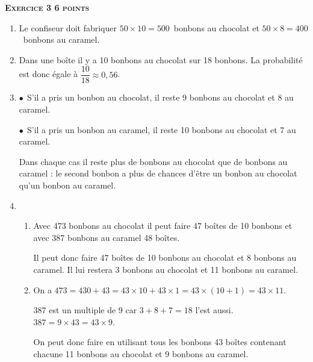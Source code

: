 \textbf{\textsc{Exercice 3 \hfill 6 points}}

\medskip

%

\begin{enumerate}
\item %
Le confiseur doit fabriquer $50\times 10 = 500$~bonbons au chocolat et $50 \times 8 = 400$~bonbons au caramel.
\item %
Dans une boîte il y a 10 bonbons au chocolat sur 18 bonbons. La probabilité est donc égale à $\dfrac{10}{18} \approx 0,56$.
\item %
$\bullet~~$S'il a pris un bonbon au chocolat, il reste 9 bonbons au chocolat et 8 au caramel.

$\bullet~~$S'il a pris un bonbon au caramel, il reste 10 bonbons au chocolat et 7 au caramel.

Dans chaque cas il reste plus de bonbons au chocolat que de bonbons au caramel : le second bonbon a plus de chances d'être un bonbon au chocolat qu'un bonbon au caramel.
\item %
	\begin{enumerate}
		\item %
Avec 473 bonbons au chocolat il peut faire 47 boîtes de 10 bonbons et avec 387 bonbons au caramel 48 boîtes.

Il peut donc faire 47 boîtes de 10 bonbons au chocolat et 8 bonbons au caramel. Il lui restera 3 bonbons au chocolat et 11 bonbons au caramel.
		\item %
On a $473 = 430 + 43 = 43\times 10 + 43\times 1 = 43 \times (10 + 1) = 43 \times 11$.

387 est un multiple de 9 car $3 + 8 + 7 = 18$ l'est aussi. $387 = 9 \times 43 = 43 \times 9$.

On peut donc faire en utilisant tous les bonbons 43 boîtes contenant chacune 11 bonbons au chocolat et 9 bonbons au caramel.
	\end{enumerate}
\end{enumerate}

\vspace{0,5cm}

